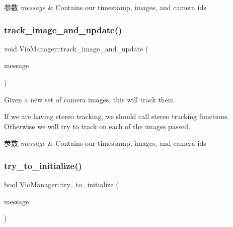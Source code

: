 \begin{DoxyParams}{参数}
{\em message} & Contains our timestamp, images, and camera ids \\
\hline
\end{DoxyParams}
\mbox{\label{classov__msckf_1_1VioManager_a626bd0d043f80c4d5e993bcfbbee0244}} 
\subsubsection{\texorpdfstring{track\+\_\+image\+\_\+and\+\_\+update()}{track\_image\_and\_update()}}
{\footnotesize\ttfamily void Vio\+Manager\+::track\+\_\+image\+\_\+and\+\_\+update (\begin{DoxyParamCaption}\item[{const \hyperlink{structov__core_1_1CameraData}{ov\+\_\+core\+::\+Camera\+Data} \&}]{message }\end{DoxyParamCaption})\hspace{0.3cm}{\ttfamily [protected]}}



Given a new set of camera images, this will track them. 

If we are having stereo tracking, we should call stereo tracking functions. Otherwise we will try to track on each of the images passed.


\begin{DoxyParams}{参数}
{\em message} & Contains our timestamp, images, and camera ids \\
\hline
\end{DoxyParams}
\mbox{\label{classov__msckf_1_1VioManager_adc329d2be4fad2addd93e01e5318c102}} 
\subsubsection{\texorpdfstring{try\+\_\+to\+\_\+initialize()}{try\_to\_initialize()}}
{\footnotesize\ttfamily bool Vio\+Manager\+::try\+\_\+to\+\_\+initialize (\begin{DoxyParamCaption}\item[{const \hyperlink{structov__core_1_1CameraData}{ov\+\_\+core\+::\+Camera\+Data} \&}]{message }\end{DoxyParamCaption})\hspace{0.3cm}{\ttfamily [protected]}}



